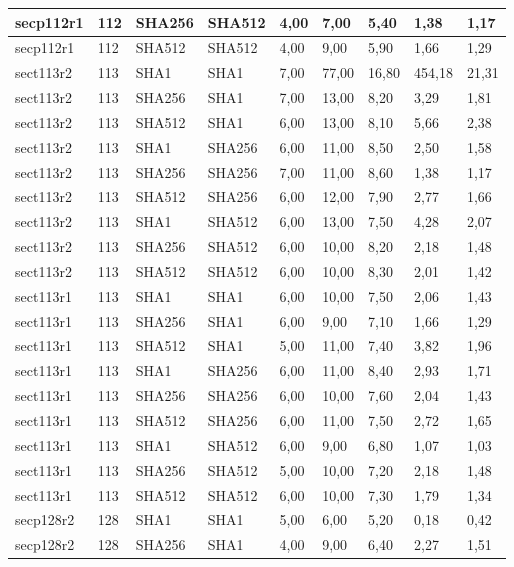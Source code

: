 \begin{longtable}{| l | l | l | l | l |l |l |l |l |}
secp112r1 & 112 & SHA256 & SHA512 & 4,00 & 7,00 & 5,40 & 1,38 & 1,17 \\ \hline 
secp112r1 & 112 & SHA512 & SHA512 & 4,00 & 9,00 & 5,90 & 1,66 & 1,29 \\ \hline 
sect113r2 & 113 & SHA1 & SHA1 & 7,00 & 77,00 & 16,80 & 454,18 & 21,31 \\ \hline 
sect113r2 & 113 & SHA256 & SHA1 & 7,00 & 13,00 & 8,20 & 3,29 & 1,81 \\ \hline 
sect113r2 & 113 & SHA512 & SHA1 & 6,00 & 13,00 & 8,10 & 5,66 & 2,38 \\ \hline 
sect113r2 & 113 & SHA1 & SHA256 & 6,00 & 11,00 & 8,50 & 2,50 & 1,58 \\ \hline 
sect113r2 & 113 & SHA256 & SHA256 & 7,00 & 11,00 & 8,60 & 1,38 & 1,17 \\ \hline 
sect113r2 & 113 & SHA512 & SHA256 & 6,00 & 12,00 & 7,90 & 2,77 & 1,66 \\ \hline 
sect113r2 & 113 & SHA1 & SHA512 & 6,00 & 13,00 & 7,50 & 4,28 & 2,07 \\ \hline 
sect113r2 & 113 & SHA256 & SHA512 & 6,00 & 10,00 & 8,20 & 2,18 & 1,48 \\ \hline 
sect113r2 & 113 & SHA512 & SHA512 & 6,00 & 10,00 & 8,30 & 2,01 & 1,42 \\ \hline 
sect113r1 & 113 & SHA1 & SHA1 & 6,00 & 10,00 & 7,50 & 2,06 & 1,43 \\ \hline 
sect113r1 & 113 & SHA256 & SHA1 & 6,00 & 9,00 & 7,10 & 1,66 & 1,29 \\ \hline 
sect113r1 & 113 & SHA512 & SHA1 & 5,00 & 11,00 & 7,40 & 3,82 & 1,96 \\ \hline 
sect113r1 & 113 & SHA1 & SHA256 & 6,00 & 11,00 & 8,40 & 2,93 & 1,71 \\ \hline 
sect113r1 & 113 & SHA256 & SHA256 & 6,00 & 10,00 & 7,60 & 2,04 & 1,43 \\ \hline 
sect113r1 & 113 & SHA512 & SHA256 & 6,00 & 11,00 & 7,50 & 2,72 & 1,65 \\ \hline 
sect113r1 & 113 & SHA1 & SHA512 & 6,00 & 9,00 & 6,80 & 1,07 & 1,03 \\ \hline 
sect113r1 & 113 & SHA256 & SHA512 & 5,00 & 10,00 & 7,20 & 2,18 & 1,48 \\ \hline 
sect113r1 & 113 & SHA512 & SHA512 & 6,00 & 10,00 & 7,30 & 1,79 & 1,34 \\ \hline 
secp128r2 & 128 & SHA1 & SHA1 & 5,00 & 6,00 & 5,20 & 0,18 & 0,42 \\ \hline 
secp128r2 & 128 & SHA256 & SHA1 & 4,00 & 9,00 & 6,40 & 2,27 & 1,51 \\ \hline 

\end{longtable}
